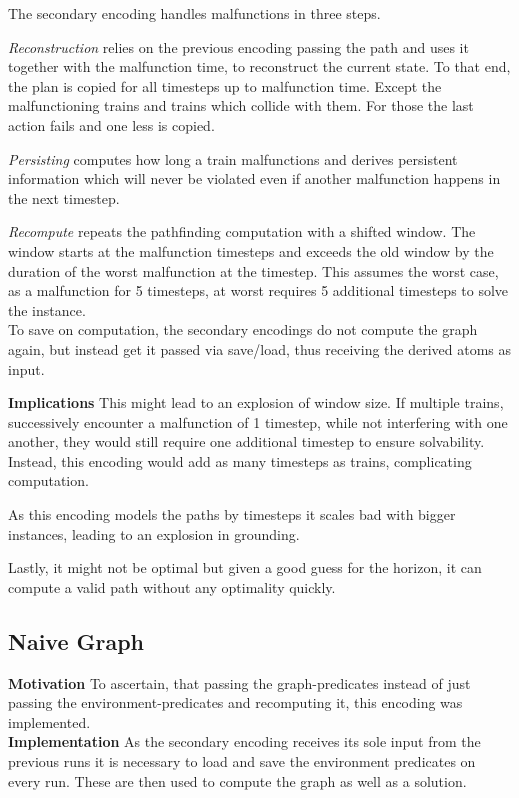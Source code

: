 \noindent The secondary encoding handles malfunctions in three steps.

\textit{Reconstruction} relies on the previous encoding passing the path and uses it together with the malfunction time, to reconstruct the current state. To that end, the plan is copied for all timesteps up to malfunction time. Except the malfunctioning trains and trains which collide with them. For those the last action fails and one less is copied. 

\textit{Persisting} computes how long a train malfunctions and derives persistent information which will never be violated even if another malfunction happens in the next timestep.

\textit{Recompute} repeats the pathfinding computation with a shifted window. The window starts at the malfunction timesteps and exceeds the old window by the duration of the worst malfunction at the timestep. This assumes the worst case, as a malfunction for 5 timesteps, at worst requires 5 additional timesteps to solve the instance.\\

To save on computation, the secondary encodings do not compute the graph again, but instead get it passed via save/load, thus receiving the derived atoms as input.

\noindent \textbf{Implications} This might lead to an explosion of window size. If multiple trains, successively encounter a malfunction of 1 timestep, while not interfering with one another, they would still require one additional timestep to ensure solvability. Instead, this encoding would add as many timesteps as trains, complicating computation.

As this encoding models the paths by timesteps it scales bad with bigger instances, leading to an explosion in grounding.

Lastly, it might not be optimal but given a good guess for the horizon, it can compute a valid path without any optimality quickly.

\subsection{Naive Graph}
\noindent \textbf{Motivation} To ascertain, that passing the graph-predicates instead of just passing the environment-predicates and recomputing it, this encoding was implemented.\\

\noindent \textbf{Implementation} As the secondary encoding receives its sole input from the previous runs it is necessary to load and save the environment predicates on every run. These are then used to compute the graph as well as a solution.\\


